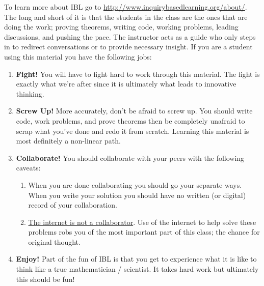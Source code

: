 To learn more about IBL go to
\href{http://www.inquirybasedlearning.org/about/}{http://www.inquirybasedlearning.org/about/}.
The long and short of it is that the students in the class are the ones that are doing the
work; proving theorems, writing code, working problems, leading discussions, and pushing
the pace. The instructor acts as a guide who only steps in to redirect conversations or to
provide necessary insight. If you are a student using this material you have the following
jobs:
\begin{enumerate}
    \item {\bf Fight!}  You will have to fight hard to work through this material.  The fight is
        exactly what we're after since it is ultimately what leads to innovative thinking.
    \item {\bf Screw Up!}  More accurately, don't be afraid to screw up.  You should write code,
    work problems, and prove theorems then be completely unafraid to scrap what you've
    done and redo it from scratch.  Learning this material is most definitely a non-linear
    path.
\item {\bf Collaborate!}  You should collaborate with your peers with the following caveats:
    \begin{enumerate}
        \item When you are done collaborating you should go your separate ways.  When you
            write your solution you should have no written (or digital) record of your
            collaboration.  
        \item \underline{The internet is not a collaborator}.  Use of the internet to help
            solve these problems robs you of the most important part of this class; the
            chance for original thought.
    \end{enumerate}
\item {\bf Enjoy!}  Part of the fun of IBL is that you get to experience what it is like to
        think like a true mathematician / scientist.  It takes hard work but ultimately
        this should be fun!
\end{enumerate}

